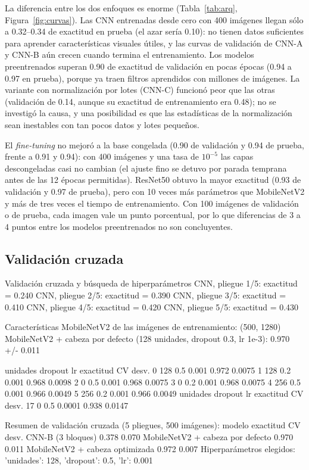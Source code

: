 \documentclass[11pt,letterpaper]{article}
\begin{document}
La diferencia entre los dos enfoques es enorme (Tabla~\ref{tab:arq}, Figura~\ref{fig:curvas}). Las CNN entrenadas desde cero con 400 imágenes llegan sólo a 0.32--0.34 de exactitud en prueba (el azar sería 0.10): no tienen datos suficientes para aprender características visuales útiles, y las curvas de validación de CNN-A y CNN-B aún crecen cuando termina el entrenamiento. Los modelos preentrenados superan 0.90 de exactitud de validación en pocas épocas (0.94 a 0.97 en prueba), porque ya traen filtros aprendidos con millones de imágenes. La variante con normalización por lotes (CNN-C) funcionó peor que las otras (validación de 0.14, aunque su exactitud de entrenamiento era 0.48); no se investigó la causa, y una posibilidad es que las estadísticas de la normalización sean inestables con tan pocos datos y lotes pequeños.

El \textit{fine-tuning} no mejoró a la base congelada (0.90 de validación y 0.94 de prueba, frente a 0.91 y 0.94): con 400 imágenes y una tasa de $10^{-5}$ las capas descongeladas casi no cambian (el ajuste fino se detuvo por parada temprana antes de las 12 épocas permitidas). ResNet50 obtuvo la mayor exactitud (0.93 de validación y 0.97 de prueba), pero con 10 veces más parámetros que MobileNetV2 y más de tres veces el tiempo de entrenamiento. Con 100 imágenes de validación o de prueba, cada imagen vale un punto porcentual, por lo que diferencias de 3 a 4 puntos entre los modelos preentrenados no son concluyentes.

\subsection{Validación cruzada}

\begin{consola}[label=out:cv]{Validación cruzada y búsqueda de hiperparámetros}
  CNN, pliegue 1/5: exactitud = 0.240
  CNN, pliegue 2/5: exactitud = 0.390
  CNN, pliegue 3/5: exactitud = 0.410
  CNN, pliegue 4/5: exactitud = 0.420
  CNN, pliegue 5/5: exactitud = 0.430

Características MobileNetV2 de las imágenes de entrenamiento: (500, 1280)
  MobileNetV2 + cabeza por defecto (128 unidades, dropout 0.3, lr 1e-3): 0.970 +/- 0.011

   unidades  dropout     lr  exactitud CV   desv.
0       128      0.5  0.001         0.972  0.0075
1       128      0.2  0.001         0.968  0.0098
2         0      0.5  0.001         0.968  0.0075
3         0      0.2  0.001         0.968  0.0075
4       256      0.5  0.001         0.966  0.0049
5       256      0.2  0.001         0.966  0.0049
    unidades  dropout      lr  exactitud CV   desv.
17         0      0.5  0.0001         0.938  0.0147

Resumen de validación cruzada (5 pliegues, 500 imágenes):
                          modelo  exactitud CV  desv.
               CNN-B (3 bloques)         0.378  0.070
MobileNetV2 + cabeza por defecto         0.970  0.011
 MobileNetV2 + cabeza optimizada         0.972  0.007
Hiperparámetros elegidos: {'unidades': 128, 'dropout': 0.5, 'lr': 0.001}
\end{consola}
\end{document}
